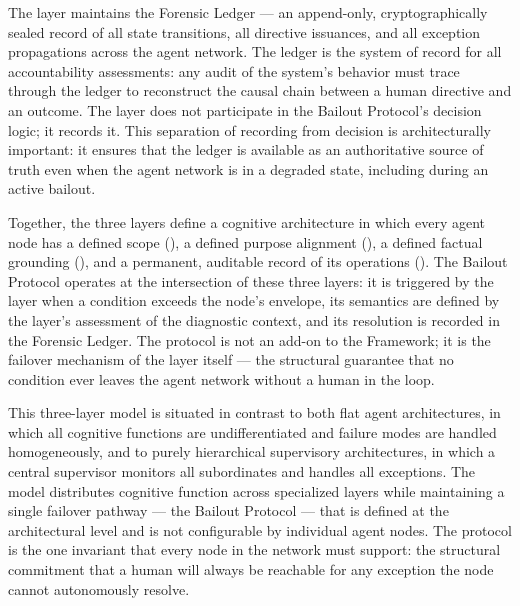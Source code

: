 The \fact{} layer maintains the Forensic Ledger — an append-only, cryptographically sealed record of all state transitions, all directive issuances, and all exception propagations across the agent network. The ledger is the system of record for all accountability assessments: any audit of the system's behavior must trace through the ledger to reconstruct the causal chain between a human directive and an outcome. The \fact{} layer does not participate in the Bailout Protocol's decision logic; it records it. This separation of recording from decision is architecturally important: it ensures that the ledger is available as an authoritative source of truth even when the agent network is in a degraded state, including during an active bailout.

Together, the three layers define a cognitive architecture in which every agent node has a defined scope (\bounds{}), a defined purpose alignment (\purpose{}), a defined factual grounding (\truth{}), and a permanent, auditable record of its operations (\fact{}). The Bailout Protocol operates at the intersection of these three layers: it is triggered by the \bounds{} layer when a condition exceeds the node's envelope, its semantics are defined by the \truth{} layer's assessment of the diagnostic context, and its resolution is recorded in the Forensic Ledger. The protocol is not an add-on to the \bxthree{} Framework; it is the failover mechanism of the \bounds{} layer itself — the structural guarantee that no condition ever leaves the agent network without a human in the loop.

This three-layer model is situated in contrast to both flat agent architectures, in which all cognitive functions are undifferentiated and failure modes are handled homogeneously, and to purely hierarchical supervisory architectures, in which a central supervisor monitors all subordinates and handles all exceptions. The \bxthree{} model distributes cognitive function across specialized layers while maintaining a single failover pathway — the Bailout Protocol — that is defined at the architectural level and is not configurable by individual agent nodes. The protocol is the one invariant that every node in the network must support: the structural commitment that a human will always be reachable for any exception the node cannot autonomously resolve.
